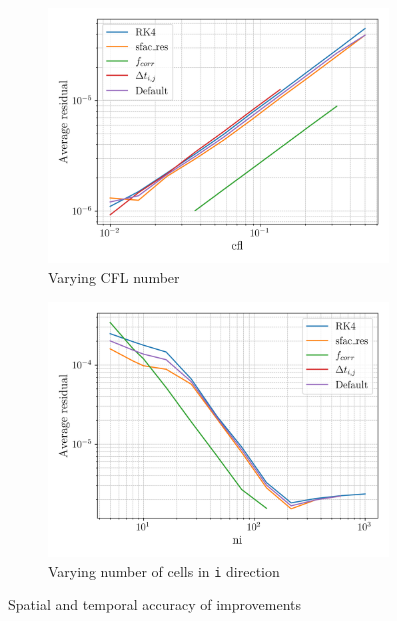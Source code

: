 \documentclass{article}
\begin{document}
\begin{figure}[H]
    \centering
    \begin{subfigure}{0.49\textwidth}
        \centering
        \includegraphics[width=0.99\textwidth]{figures/improvements_cfl_residual.png}
        \caption{Varying CFL number}
        \label{fig:improvements_cfl_residual}
    \end{subfigure}
    \begin{subfigure}{0.49\textwidth}
        \centering
        \includegraphics[width=0.99\textwidth]{figures/improvements_ni_residual.png}
        \caption{Varying number of cells in \texttt{i} direction}
        \label{fig:improvements_ni_residual}
    \end{subfigure}
    \caption{Spatial and temporal accuracy of improvements}
\end{figure}
\end{document}
